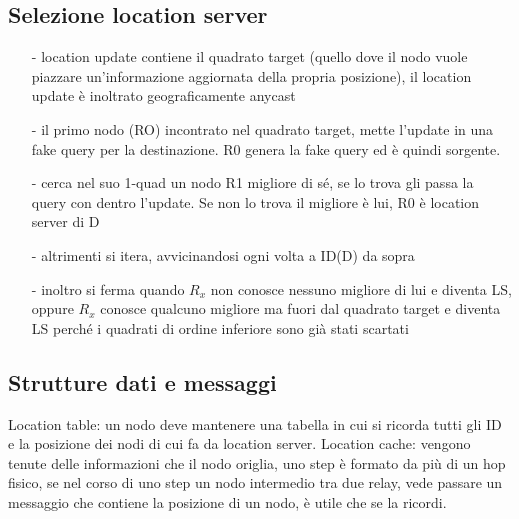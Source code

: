 \documentclass[12pt,italian]{report}
\begin{document}
\subsection{Selezione location server}
\begin{itemize}
    \item [-] location update contiene il quadrato target (quello dove il nodo vuole piazzare un'informazione aggiornata della propria posizione), il location update è inoltrato geograficamente anycast
    \item [-] il primo nodo (RO) incontrato nel quadrato target, mette l'update in una fake query per la destinazione. R0 genera la fake query ed è quindi sorgente.
    \item [-] cerca nel suo 1-quad un nodo R1 migliore di sé, se lo trova gli passa la query con dentro l'update. Se non lo trova il migliore è lui, R0 è location server di D
    \item [-] altrimenti si itera, avvicinandosi ogni volta a ID(D) da sopra
    \item [-] inoltro si ferma quando $R_x$ non conosce nessuno migliore di lui e diventa LS, oppure $R_x$ conosce qualcuno migliore ma fuori dal quadrato target e diventa LS perché i quadrati di ordine inferiore sono già stati scartati
\end{itemize}

\subsection{Strutture dati e messaggi}
\noindent Location table: un nodo deve mantenere una tabella in cui si ricorda tutti gli ID e la posizione dei nodi di cui fa da location server. 
\noindent Location cache: vengono tenute delle informazioni che il nodo origlia, uno step è formato da più di un hop fisico, se nel corso di uno step un nodo intermedio tra due relay, vede passare un messaggio che contiene la posizione di un nodo, è utile che se la ricordi. 
\end{document}
